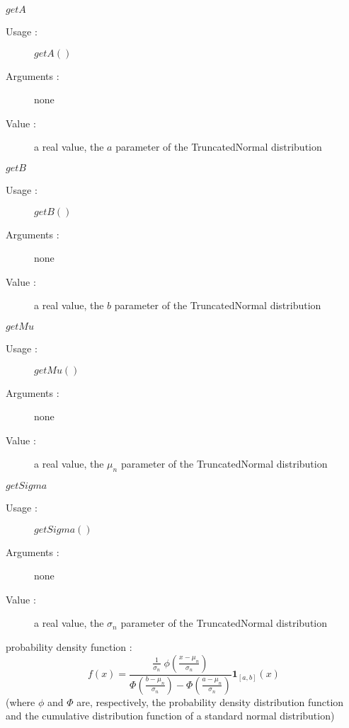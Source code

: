 \begin{description}
\begin{description}
  \item $getA$
    \begin{description}
    \item[Usage :] $getA()$
    \item[Arguments :] none
    \item[Value :]  a real value, the $a$ parameter of the TruncatedNormal distribution
    \end{description}
    \bigskip
  \item $getB$
    \begin{description}
    \item[Usage :] $getB()$
    \item[Arguments :] none
    \item[Value :]  a real value, the  $b$ parameter of the TruncatedNormal distribution
    \end{description}
    \bigskip
  \item $getMu$
    \begin{description}
    \item[Usage :] $getMu()$
    \item[Arguments :] none
    \item[Value :]  a real value, the $\mu_n$ parameter of the TruncatedNormal distribution
    \end{description}
    \bigskip
  \item $getSigma$
    \begin{description}
    \item[Usage :] $getSigma()$
    \item[Arguments :] none
    \item[Value :]  a real value, the $\sigma_n$ parameter of the TruncatedNormal distribution
    \end{description}
    \bigskip
  \end{description}

\item[Details :]  \rule{0pt}{1em}
  \begin{description}
  \item probability density function :
    $$
    f(x) =
    \frac{\frac{1}{\sigma_n}\;\phi(\frac{x-\mu_n}{\sigma_n})}
    {\Phi(\frac{b-\mu_n}{\sigma_n}) - \Phi(\frac{a-\mu_n}{\sigma_n})}
    \boldsymbol{1}_{[a, b]}(x)
    $$
    (where $\phi$ and $\Phi$ are, respectively, the probability density distribution function and the cumulative
    distribution function of a standard normal distribution)


\end{description}
\end{description}
